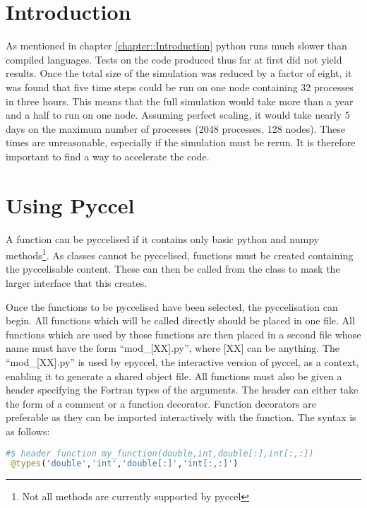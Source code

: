 
\section{Introduction}

As mentioned in chapter \ref{chapter::Introduction} python runs much slower than compiled languages. Tests on the code produced thus far at first did not yield results. Once the total size of the simulation was reduced by a factor of eight, it was found that five time steps could be run on one node containing 32 processes in three hours. This means that the full simulation would take more than a year and a half to run on one node. Assuming perfect scaling, it would take nearly 5 days on the maximum number of processes (2048 processes, 128 nodes). These times are unreasonable, especially if the simulation must be rerun. It is therefore important to find a way to accelerate the code.



\section{Using Pyccel}

A function can be pyccelised if it contains only basic python and numpy methods\footnote{Not all methods are currently supported by pyccel}. As classes cannot be pyccelised, functions must be created containing the pyccelisable content. These can then be called from the class to mask the larger interface that this creates.

Once the functions to be pyccelised have been selected, the pyccelisation can begin. All functions which will be called directly should be placed in one file. All functions which are used by those functions are then placed in a second file whose name must have the form ``mod\_[XX].py'', where [XX] can be anything. The ``mod\_[XX].py'' is used by epyccel, the interactive version of pyccel, as a context, enabling it to generate a shared object file. All functions must also be given a header specifying the Fortran types of the arguments. The header can either take the form of a comment or a function decorator. Function decorators are preferable as they can be imported interactively with the function. The syntax is as follows:

\begin{lstlisting}[language=python,style=pythonStyle]
 #$ header function my_function(double,int,double[:],int[:,:])
 @types('double','int','double[:]','int[:,:]')
\end{lstlisting}

